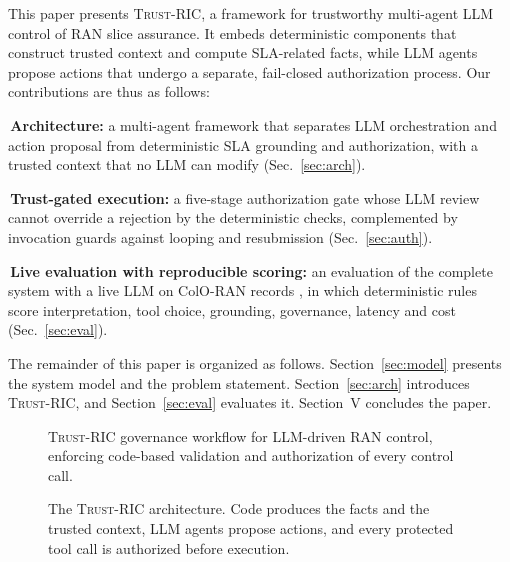 \documentclass[conference]{IEEEtran}
\newcommand{\fw}{\textsc{Trust-RIC}}
\begin{document}
This paper presents \fw{}, a framework for trustworthy multi-agent LLM control of RAN slice assurance. It embeds deterministic components that construct trusted context and compute SLA-related facts, while LLM agents propose actions that undergo a separate, fail-closed authorization process.
Our contributions are thus as follows:

\noindent\textbullet\,\textbf{Architecture:} a multi-agent framework that separates LLM orchestration and action proposal from deterministic SLA grounding and authorization, with a trusted context that no LLM can modify (Sec.~\ref{sec:arch}).

\noindent\textbullet\,\textbf{Trust-gated execution:} a five-stage authorization gate whose LLM review cannot override a rejection by the deterministic checks, complemented by invocation guards against looping and resubmission (Sec.~\ref{sec:auth}).

\noindent\textbullet\,\textbf{Live evaluation with reproducible scoring:} an evaluation of the complete system with a live LLM on ColO-RAN records \cite{polese2023coloran}, in which deterministic rules score interpretation, tool choice, grounding, governance, latency and cost (Sec.~\ref{sec:eval}).

The remainder of this paper is organized as follows. Section~\ref{sec:model} presents the system model and the problem statement. Section~\ref{sec:arch} introduces \fw{}, and Section~\ref{sec:eval} evaluates it. Section~V concludes the paper.


\begin{figure}[!t]
\centering
\resizebox{0.85\columnwidth}{!}{}
\caption{\fw{} governance workflow for LLM-driven RAN control, enforcing code-based validation and authorization of every control call.}
\label{fig:scenario}
\end{figure}

\begin{figure}[!t]
\centering
\resizebox{0.85\textwidth}{!}{}
\caption{The \fw{} architecture. Code produces the facts and the trusted context, LLM agents propose actions, and every protected tool call is authorized before execution.}
\label{fig:arch}
\end{figure}


\end{document}
